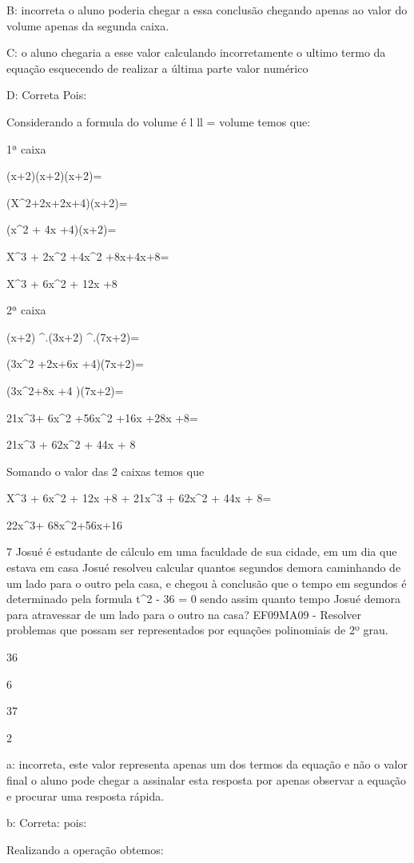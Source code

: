 B: incorreta o aluno poderia chegar a essa conclusão chegando apenas ao
valor do volume apenas da segunda caixa.

C: o aluno chegaria a esse valor calculando incorretamente o ultimo
termo da equação esquecendo de realizar a última parte valor numérico

D: Correta Pois:

Considerando a formula do volume é l\times 
l\times l = volume temos que:

1ª caixa

(x+2)\times (x+2)\times (x+2)=

(X^2+2x+2x+4)\times (x+2)=

(x^2 + 4x +4)\times (x+2)=

X^3 + 2x^2 +4x^2 +8x+4x+8=

X^3 + 6x^2 + 12x +8

2ª caixa

(x+2) ^.(3x+2) ^.(7x+2)=

(3x^2 +2x+6x +4)\times (7x+2)=

(3x^2+8x +4 )\times (7x+2)=

21x^3+ 6x^2 +56x^2 +16x +28x +8=

21x^3 + 62x^2 + 44x + 8

Somando o valor das 2 caixas temos que

X^3 + 6x^2 + 12x +8 + 21x^3 + 62x^2 + 44x + 8=

22x^3+ 68x^2+56x+16

\num{7} Josué é estudante de cálculo em uma faculdade de sua cidade, em um
dia que estava em casa Josué resolveu calcular quantos segundos demora
caminhando de um lado para o outro pela casa, e chegou à conclusão que o
tempo em segundos é determinado pela formula t^2 - 36 = 0 sendo assim
quanto tempo Josué demora para atravessar de um lado para o outro na
casa? EF09MA09 - Resolver problemas que possam ser representados por
equações polinomiais de 2º grau.

\item 36
\item 6
\item 37
\item 2

a: incorreta, este valor representa apenas um dos termos da equação e
não o valor final o aluno pode chegar a assinalar esta resposta por
apenas observar a equação e procurar uma resposta rápida.

b: Correta: pois:

Realizando a operação obtemos:

